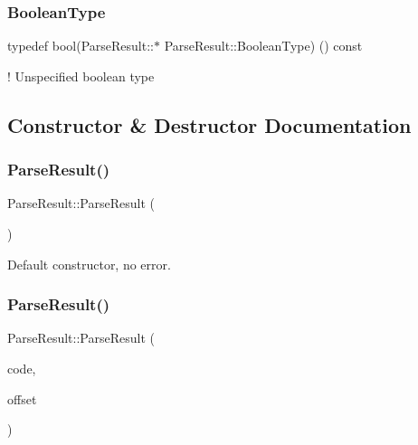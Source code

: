 \subsubsection{\texorpdfstring{Boolean\+Type}{BooleanType}}
{\footnotesize\ttfamily typedef bool(Parse\+Result\+::$\ast$ Parse\+Result\+::\+Boolean\+Type) () const}



! Unspecified boolean type 



\subsection{Constructor \& Destructor Documentation}
\mbox{\label{structParseResult_acd4a266f815bec59fa27f64f1923fe9e}} 
\subsubsection{\texorpdfstring{Parse\+Result()}{ParseResult()}\hspace{0.1cm}{\footnotesize\ttfamily [1/2]}}
{\footnotesize\ttfamily Parse\+Result\+::\+Parse\+Result (\begin{DoxyParamCaption}{ }\end{DoxyParamCaption})\hspace{0.3cm}{\ttfamily [inline]}}



Default constructor, no error. 

\mbox{\label{structParseResult_a38ca49a53e80633d0864ad5026adaf84}} 
\subsubsection{\texorpdfstring{Parse\+Result()}{ParseResult()}\hspace{0.1cm}{\footnotesize\ttfamily [2/2]}}
{\footnotesize\ttfamily Parse\+Result\+::\+Parse\+Result (\begin{DoxyParamCaption}\item[{\hyperlink{group__RAPIDJSON__ERRORS_ga8d4b32dfc45840bca189ade2bbcb6ba7}{Parse\+Error\+Code}}]{code,  }\item[{size\+\_\+t}]{offset }\end{DoxyParamCaption})\hspace{0.3cm}{\ttfamily [inline]}}



